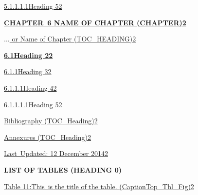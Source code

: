 \documentclass[12pt]{report}
\begin{document}
\begin{FlushLeft}
\href{}{5.1.1.1.1Heading 52}
\end{FlushLeft}\par

\begin{FlushLeft}
\textbf{\uppercase{\href{}{Chapter\ 6  Name of chapter (Chapter)2}}}
\end{FlushLeft}\par

\href{}{$ \ldots $ or Name of Chapter (TOC\_HEADING)2}\par

\begin{FlushLeft}
\textbf{\href{}{6.1Heading 22}}
\end{FlushLeft}\par

\begin{FlushLeft}
\href{}{6.1.1Heading 32}
\end{FlushLeft}\par

\begin{FlushLeft}
\href{}{6.1.1.1Heading 42}
\end{FlushLeft}\par

\begin{FlushLeft}
\href{}{6.1.1.1.1Heading 52}
\end{FlushLeft}\par

\href{}{Bibliography (TOC\_Heading)2}\par

\href{}{Annexures (TOC\_Heading)2}\par

\href{}{Last\ Updated:  12 December 20142}\par


\vspace{\baselineskip}



\newpage

\vspace{\baselineskip}\begin{FlushLeft}
{\fontsize{14pt}{16.8pt}\selectfont \textbf{\uppercase{List of Tables (Heading 0)}}\par}
\end{FlushLeft}\par

\begin{FlushLeft}
\href{}{Table 11:This\ is the title of the table.  (CaptionTop\_Tbl\_Fig)2}
\end{FlushLeft}\par
\end{document}
